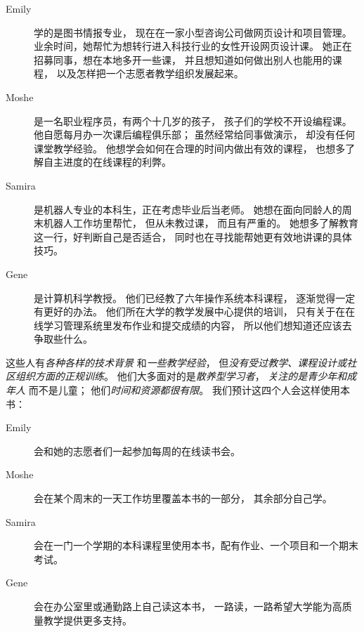 \begin{description}

\item[Emily]
  学的是图书情报专业，
  现在在一家小型咨询公司做网页设计和项目管理。
  业余时间，她帮忙为想转行进入科技行业的女性开设网页设计课。
  她正在招募同事，想在本地多开一些课，
  并且想知道如何做出别人也能用的课程，
  以及怎样把一个志愿者教学组织发展起来。

\item[Moshe]
  是一名职业程序员，有两个十几岁的孩子，
  孩子们的学校不开设编程课。
  他自愿每月办一次课后编程俱乐部；
  虽然经常给同事做演示，
  却没有任何课堂教学经验。
  他想学会如何在合理的时间内做出有效的课程，
  也想多了解自主进度的在线课程的利弊。

\item[Samira]
  是机器人专业的本科生，正在考虑毕业后当老师。
  她想在面向同龄人的周末机器人工作坊里帮忙，
  但从未教过课，
  而且有严重的。
  她想多了解教育这一行，好判断自己是否适合，
  同时也在寻找能帮她更有效地讲课的具体技巧。

\item[Gene]
  是计算机科学教授。
  他们已经教了六年操作系统本科课程，
  逐渐觉得一定有更好的办法。
  他们所在大学的教学发展中心提供的培训，
  只有关于在在线学习管理系统里发布作业和提交成绩的内容，
  所以他们想知道还应该去争取些什么。

\end{description}

这些人有\emph{各种各样的技术背景}
和\emph{一些教学经验}，
但\emph{没有受过教学、课程设计或社区组织方面的正规训练}。
他们大多面对的是\emph{散养型学习者}，
\emph{关注的是青少年和成年人}
而不是儿童；
他们\emph{时间和资源都很有限}。
我们预计这四个人会这样使用本书：

\begin{description}

\item[Emily]
  会和她的志愿者们一起参加每周的在线读书会。

\item[Moshe]
  会在某个周末的一天工作坊里覆盖本书的一部分，
  其余部分自己学。

\item[Samira]
  会在一门一个学期的本科课程里使用本书，配有作业、一个项目和一个期末考试。

\item[Gene]
  会在办公室里或通勤路上自己读这本书，
  一路读，一路希望大学能为高质量教学提供更多支持。

\end{description}

